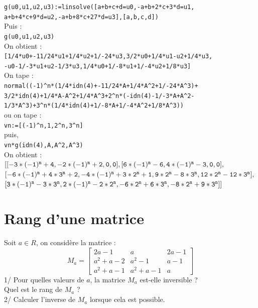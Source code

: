 \documentclass[a4paper,11pt]{book}
\begin{document}
{\tt g(u0,u1,u2,u3):=linsolve([a+b+c+d=u0,-a+b+2*c+3*d=u1,}\\
\hspace*{1cm} {\tt a+b+4*c+9*d=u2,-a+b+8*c+27*d=u3],[a,b,c,d])}\\
Puis :\\
{\tt g(u0,u1,u2,u3)}\\
On obtient :\\
{\tt [1/4*u0+-11/24*u1+1/4*u2+1/-24*u3,3/2*u0+1/4*u1-u2+1/4*u3,}\\
{\tt -u0-1/-3*u1+u2-1/3*u3,1/4*u0+1/-8*u1+1/-4*u2+1/8*u3]}\\
On tape :\\
{\tt normal((-1)\verb|^|n*(1/4*idn(4)+-11/24*A+1/4*A\verb|^|2+1/-24*A\verb|^|3)+}\\
{\tt 3/2*idn(4)+1/4*A-A\verb|^|2+1/4*A\verb|^|3+2\verb|^|n*(-idn(4)-1/-3*A+A\verb|^|2-}\\
{\tt 1/3*A\verb|^|3)+3\verb|^|n*(1/4*idn(4)+1/-8*A+1/-4*A\verb|^|2+1/8*A\verb|^|3))}\\ 
ou on tape :\\
{\tt vn:=[(-1)\verb|^|n,1,2\verb|^|n,3\verb|^|n]}\\
puis,\\
{\tt vn*g(idn(4),A,A\verb|^|2,A\verb|^|3)}\\
On obtient :\\
${\tt [[-3*(-1)^n+4,-2*(-1)^n+2,0,0],[6*(-1)^n-6,4*(-1)^n-3,0,0],}$\\
${\tt [-6*(-1)^n+4*3^n+2,-4*(-1)^n+3*2^n+1,9*2^n-8*3^n,12*2^n-12*3^n],}$\\
${\tt [3*(-1)^n-3*3^n,2*(-1)^n-2*2^n,-6*2^n+6*3^n,-8*2^n+9*3^n]]}$

\section{Rang d'une matrice}
Soit $a \in R$, on consid\`ere la matrice :\\
$$M_a=
\left [\begin{array}{rrr}
2a-1&a&2a-1\\
a^2+a-2&a^2-1&a-1\\
a^2+a-1&a^2+a-1&a
\end{array}
\right]$$
1/ Pour quelles valeurs de $a$, la matrice $M_a$ est-elle inversible ?\\
Quel est le rang de $M_a$ ?\\
2/ Calculer l'inverse de $M_a$  lorsque cela est possible.\\
 
\end{document}

